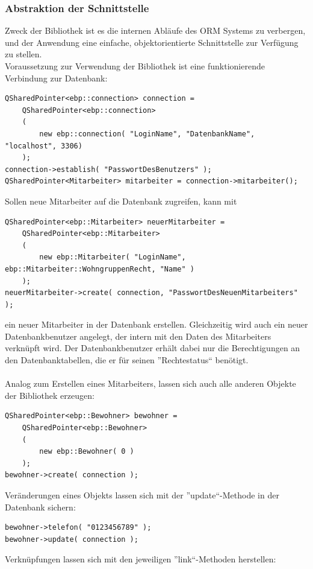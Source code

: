 \subsubsection{Abstraktion der Schnittstelle}
\lstset{language=c++}
Zweck der Bibliothek ist es die internen Abläufe des ORM Systems zu verbergen, und der Anwendung eine einfache, objektorientierte Schnittstelle zur Verfügung zu stellen.\\
Voraussetzung zur Verwendung der Bibliothek ist eine funktionierende Verbindung zur Datenbank:\\
\begin{lstlisting}
QSharedPointer<ebp::connection> connection =
	QSharedPointer<ebp::connection>
	(
		new ebp::connection( "LoginName", "DatenbankName", "localhost", 3306)
	);
connection->establish( "PasswortDesBenutzers" );
QSharedPointer<Mitarbeiter> mitarbeiter = connection->mitarbeiter();
\end{lstlisting}
Sollen neue Mitarbeiter auf die Datenbank zugreifen, kann mit\\
\begin{lstlisting}
QSharedPointer<ebp::Mitarbeiter> neuerMitarbeiter =
	QSharedPointer<ebp::Mitarbeiter>
	(
		new ebp::Mitarbeiter( "LoginName", ebp::Mitarbeiter::WohngruppenRecht, "Name" )
	);
neuerMitarbeiter->create( connection, "PasswortDesNeuenMitarbeiters" );
\end{lstlisting}
ein neuer Mitarbeiter in der Datenbank erstellen. Gleichzeitig wird auch ein neuer Datenbankbenutzer angelegt, der intern mit den Daten des Mitarbeiters verknüpft wird.
Der Datenbankbenutzer erhält dabei nur die Berechtigungen an den Datenbanktabellen, die er für seinen ''Rechtestatus`` benötigt.\\
\\
Analog zum Erstellen eines Mitarbeiters, lassen sich auch alle anderen Objekte der Bibliothek erzeugen:\\
\begin{lstlisting}
QSharedPointer<ebp::Bewohner> bewohner =
	QSharedPointer<ebp::Bewohner>
	(
		new ebp::Bewohner( 0 )
	);
bewohner->create( connection );
\end{lstlisting}
Veränderungen eines Objekts lassen sich mit der ''update``-Methode in der Datenbank sichern:\\
\begin{lstlisting}
bewohner->telefon( "0123456789" );
bewohner->update( connection );
\end{lstlisting}
Verknüpfungen lassen sich mit den jeweiligen ''link``-Methoden herstellen:\\
